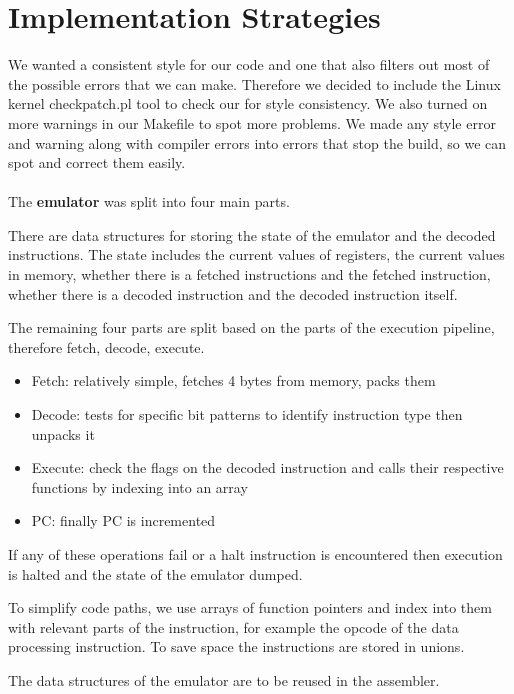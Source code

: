 \documentclass[11pt]{article}
\begin{document}
\section{Implementation Strategies}

We wanted a consistent style for our code and one that also filters out most of
the possible errors that we can make. Therefore we decided to include the Linux
kernel checkpatch.pl tool to check our for style consistency. We also turned on
more warnings in our Makefile to spot more problems. We made any style error and
warning along with compiler errors into errors that stop the build, so we can
spot and correct them easily. \\ \\

The \textbf{emulator} was split into four main parts.

There are data structures for storing the state of the emulator and the
decoded instructions. The state includes the current values of registers, the
current values in memory, whether there is a fetched instructions and the
fetched instruction, whether there is a decoded instruction and the decoded
instruction itself.

The remaining four parts are split based on the parts of the execution pipeline,
therefore fetch, decode, execute.

\begin{itemize}
    \item Fetch: relatively simple, fetches 4 bytes from memory, packs them
    \item Decode: tests for specific bit patterns to identify instruction type
      then unpacks it
    \item Execute: check the flags on the decoded instruction and calls their
      respective functions by indexing into an array
    \item PC: finally PC is incremented
\end{itemize}

If any of these operations fail or a halt instruction is encountered then
execution is halted and the state of the emulator dumped.

To simplify code paths, we use arrays of function pointers and index into them
with relevant parts of the instruction, for example the opcode of the data
processing instruction. To save space the instructions are stored in unions.

The data structures of the emulator are to be reused in the assembler. \\
\end{document}
